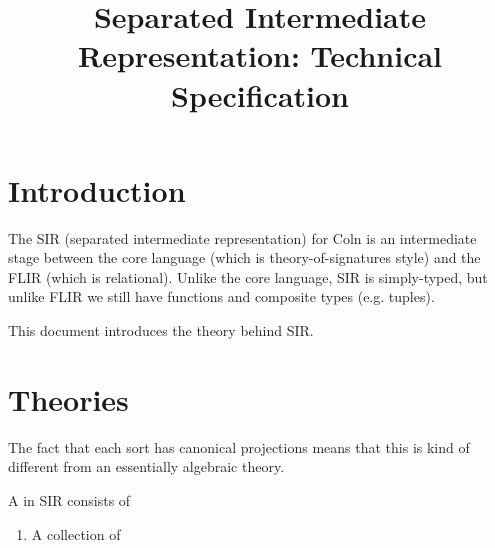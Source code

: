 \documentclass{scrartcl}
\title{Separated Intermediate Representation: Technical Specification}
\begin{document}
\maketitle

\section{Introduction}

The SIR (separated intermediate representation) for Coln is an intermediate stage between the core language (which is theory-of-signatures style) and the FLIR (which is relational). Unlike the core language, SIR is simply-typed, but unlike FLIR we still have functions and composite types (e.g. tuples).

This document introduces the theory behind SIR.

\section{Theories}

The fact that each sort has canonical projections means that this is kind of different from an essentially algebraic theory.

\begin{definition}
  A  in SIR consists of
  \begin{enumerate}
    \item A collection of 
  \end{enumerate}
\end{definition}
\end{document}
